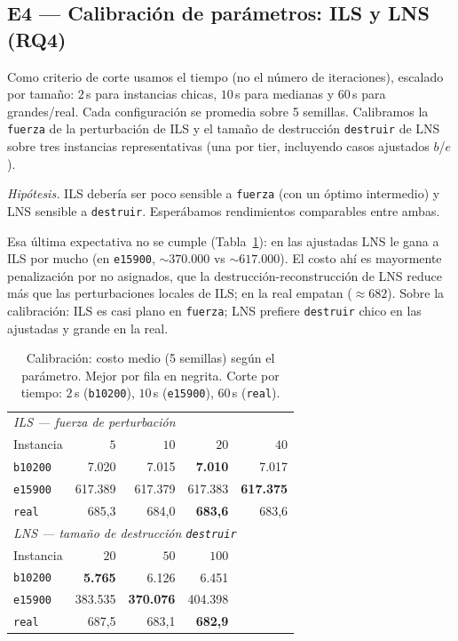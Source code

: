 \documentclass[11pt,a4paper]{article}
\newcommand{\code}[1]{\texttt{#1}}
\begin{document}
\subsection{E4 --- Calibración de parámetros: ILS y LNS (RQ4)}
Como criterio de corte usamos el tiempo (no el número de iteraciones), escalado por tamaño:
$2$\,s para instancias chicas, $10$\,s para medianas y $60$\,s para grandes/real. Cada
configuración se promedia sobre 5 semillas. Calibramos la \code{fuerza} de la perturbación de
ILS y el tamaño de destrucción \code{destruir} de LNS sobre tres instancias representativas
(una por tier, incluyendo casos ajustados $b$/$e$).

\emph{Hipótesis.} ILS debería ser poco sensible a \code{fuerza} (con un óptimo intermedio) y
LNS sensible a \code{destruir}. Esperábamos rendimientos comparables entre ambas.

Esa última expectativa no se cumple (Tabla~\ref{tab:ils}): en las ajustadas LNS le gana a ILS
por mucho (en \code{e15900}, $\sim370.000$ vs $\sim617.000$). El costo ahí es mayormente
penalización por no asignados, que la destrucción-reconstrucción de LNS reduce más que las
perturbaciones locales de ILS; en la real empatan ($\approx682$). Sobre la
calibración: ILS es casi plano en \code{fuerza}; LNS prefiere \code{destruir} chico en las
ajustadas y grande en la real.

\begin{table}[ht]
\centering
\caption{Calibración: costo medio (5 semillas) según el parámetro. Mejor por fila en negrita.
Corte por tiempo: $2$\,s (\code{b10200}), $10$\,s (\code{e15900}), $60$\,s (\code{real}).}
\label{tab:ils}
\small
\begin{tabular}{l r r r r}
\toprule
\multicolumn{5}{l}{\textit{ILS --- fuerza de perturbación}}\\
Instancia & $5$ & $10$ & $20$ & $40$ \\
\midrule
\code{b10200} & 7.020 & 7.015 & \textbf{7.010} & 7.017 \\
\code{e15900} & 617.389 & 617.379 & 617.383 & \textbf{617.375} \\
\code{real}   & 685,3 & 684,0 & \textbf{683,6} & 683,6 \\
\midrule
\multicolumn{5}{l}{\textit{LNS --- tamaño de destrucción \code{destruir}}}\\
Instancia & $20$ & $50$ & $100$ & \\
\midrule
\code{b10200} & \textbf{5.765} & 6.126 & 6.451 & \\
\code{e15900} & 383.535 & \textbf{370.076} & 404.398 & \\
\code{real}   & 687,5 & 683,1 & \textbf{682,9} & \\
\bottomrule
\end{tabular}
\end{table}
\end{document}

